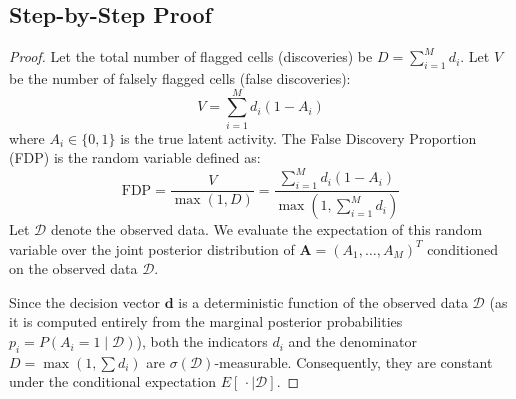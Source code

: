 \documentclass[11pt,a4paper]{article}
\begin{document}
\subsection{Step-by-Step Proof}
\begin{proof}
Let the total number of flagged cells (discoveries) be $D = \sum_{i=1}^M d_i$. Let $V$ be the number of falsely flagged cells (false discoveries):
\[
V = \sum_{i=1}^M d_i (1 - A_i)
\]
where $A_i \in \{0, 1\}$ is the true latent activity. The False Discovery Proportion (FDP) is the random variable defined as:
\[
\text{FDP} = \frac{V}{\max(1, D)} = \frac{\sum_{i=1}^M d_i (1 - A_i)}{\max(1, \sum_{i=1}^M d_i)}
\]
Let $\mathcal{D}$ denote the observed data. We evaluate the expectation of this random variable over the joint posterior distribution of $\mathbf{A} = (A_1, \dots, A_M)^T$ conditioned on the observed data $\mathcal{D}$. 

Since the decision vector $\mathbf{d}$ is a deterministic function of the observed data $\mathcal{D}$ (as it is computed entirely from the marginal posterior probabilities $p_i = P(A_i = 1 \mid \mathcal{D})$), both the indicators $d_i$ and the denominator $D = \max(1, \sum d_i)$ are $\sigma(\mathcal{D})$-measurable. Consequently, they are constant under the conditional expectation $E[\,\cdot \mid \mathcal{D}]$.


\end{proof}
\end{document}
